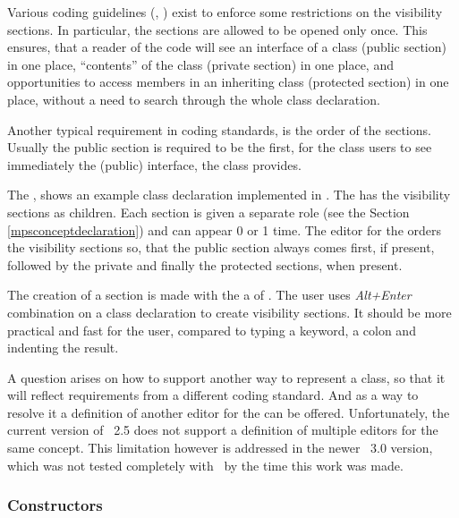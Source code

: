 Various coding guidelines (\cite{cppclasslayout}, \cite{googlecppstyle}) exist to enforce some 
restrictions on the visibility sections. In particular, the sections are allowed to be opened only once. This ensures, that a
reader of the code will see an interface of a class (public section) in one place,
``contents'' of the class (private section) in one place, and opportunities to access members in
an inheriting class (protected section) in one place, without a need to search through
the whole class declaration.

Another typical requirement in coding standards, is the order of the sections. Usually the public 
section is required to be the first, for the class users to see immediately the (public) interface,
the class provides.

\pcppsolution



The , shows an example class declaration implemented in \pcpp.
The   has the visibility sections as children. Each section is given a separate role 
(see the Section \ref{mpsconceptdeclaration}) and can appear 0 or 1 time. The editor for the   
orders the visibility sections so, that the public section always comes first, if present, 
followed by the private and finally the protected sections, when present.

The creation of a section is made with the a of . The user
uses \emph{Alt+Enter} combination on a class declaration to create visibility sections.
It should be more practical and fast for the user, compared to typing a keyword, a colon and
indenting the result.

A question arises on how to support another way to represent a class, so that it will reflect
requirements from a different coding standard. And as a way to resolve it a definition of 
another editor for the   can be offered. Unfortunately, the current version of \jbmps\ 2.5
does not support a definition of multiple editors for the same concept. This limitation however
is addressed in the newer \jbmps\ 3.0 version, which was not tested completely with \mbdr\ by the time
this work was made.


\subsubsection{Constructors}
\label{classconstructors}

